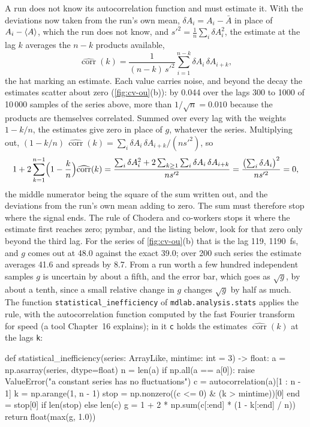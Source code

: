 A run does not know its autocorrelation function and must estimate it.
With the deviations now taken from the run's own mean, $\delta A_i = A_i -
\bar A$ in place of $A_i - \langle A \rangle$, which the run does not know, and
$s'^2 = \frac1n\sum_i\delta A_i^2$, the estimate at the lag $k$ averages the
$n - k$ products available,
\begin{equation*}
   \widehat{\operatorname{corr}}(k)
   = \frac{1}{(n - k)\,s'^2}\sum_{i=1}^{n-k}\delta A_i\,\delta A_{i+k} ,
\end{equation*}
the hat marking an estimate. Each value carries noise, and beyond the
decay the estimates scatter about zero (\cref{fig:cv-ou}(b)): by 0.044
over the lags 300 to 1000 of 10\,000 samples of the series above, more
than $1/\sqrt n = 0.010$ because the products are themselves correlated.
Summed over every lag with the weights $1 - k/n$, the estimates give zero
in place of $g$, whatever the series. Multiplying out,
$(1 - k/n)\,\widehat{\operatorname{corr}}(k) = \sum_i\delta A_i\,\delta
A_{i+k}/(n s'^2)$, so
\begin{equation*}
   1 + 2\sum_{k=1}^{n-1}\Bigl(1 - \frac kn\Bigr)
   \widehat{\operatorname{corr}}(k)
   = \frac{\sum_i\delta A_i^2 + 2\sum_{k\ge1}\sum_i\delta A_i\,\delta
   A_{i+k}}{n s'^2}
   = \frac{\bigl(\sum_i\delta A_i\bigr)^2}{n s'^2} = 0 ,
\end{equation*}
the middle numerator being the square of the sum written out, and the
deviations from the run's own mean adding to zero. The sum must therefore
stop where the signal ends. The rule of Chodera and
co-workers\cite{Chodera2007} stops it where the estimate first reaches
zero; pymbar, and the listing below, look for that zero only beyond the
third lag. For the series of
\cref{fig:cv-ou}(b) that is the lag 119, \SI{1190}{\femto\second}, and $g$
comes out at 48.0 against the exact 39.0; over 200 such series the
estimate averages 41.6 and spreads by 8.7. From a run worth a few hundred
independent samples $g$ is uncertain by about a fifth, and the error bar,
which goes as $\sqrt g$, by about a tenth, since a small relative change
in $g$ changes $\sqrt g$ by half as much. The function
\texttt{statistical\_inefficiency} of \texttt{mdlab.analysis.stats}
applies the rule, with the autocorrelation function computed by the fast
Fourier transform for speed (a tool Chapter~16 explains); in it
\texttt{c} holds the estimates $\widehat{\operatorname{corr}}(k)$ at the
lags \texttt{k}:

\begin{code}
def statistical_inefficiency(series: ArrayLike, mintime: int = 3) -> float:
    a = np.asarray(series, dtype=float)
    n = len(a)
    if np.all(a == a[0]):
        raise ValueError("a constant series has no fluctuations")
    c = autocorrelation(a)[1 : n - 1]
    k = np.arange(1, n - 1)
    stop = np.nonzero((c <= 0) & (k > mintime))[0]
    end = stop[0] if len(stop) else len(c)
    g = 1 + 2 * np.sum(c[:end] * (1 - k[:end] / n))
    return float(max(g, 1.0))
\end{code}

